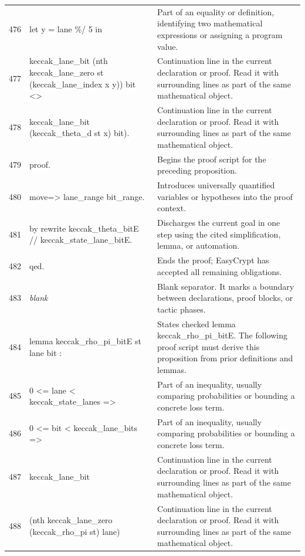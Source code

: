 \documentclass[10pt]{article}
\begin{document}
\begin{longtable}{r L{0.53\textwidth} L{0.37\textwidth}}
476 & {\ttfamily\scriptsize    let y = lane \%/ 5 in} & Part of an equality or definition, identifying two mathematical expressions or assigning a program value. \\
477 & {\ttfamily\scriptsize    keccak\_lane\_bit (nth keccak\_lane\_zero st (keccak\_lane\_index x y)) bit <>} & Continuation line in the current declaration or proof.  Read it with surrounding lines as part of the same mathematical object. \\
478 & {\ttfamily\scriptsize    keccak\_lane\_bit (keccak\_theta\_d st x) bit).} & Continuation line in the current declaration or proof.  Read it with surrounding lines as part of the same mathematical object. \\
479 & {\ttfamily\scriptsize proof.} & Begins the proof script for the preceding proposition. \\
480 & {\ttfamily\scriptsize move=> lane\_range bit\_range.} & Introduces universally quantified variables or hypotheses into the proof context. \\
481 & {\ttfamily\scriptsize by rewrite keccak\_theta\_bitE // keccak\_state\_lane\_bitE.} & Discharges the current goal in one step using the cited simplification, lemma, or automation. \\
482 & {\ttfamily\scriptsize qed.} & Ends the proof; EasyCrypt has accepted all remaining obligations. \\
483 & {\ttfamily\scriptsize \emph{blank}} & Blank separator.  It marks a boundary between declarations, proof blocks, or tactic phases. \\
484 & {\ttfamily\scriptsize lemma keccak\_rho\_pi\_bitE st lane bit :} & States checked lemma keccak\_rho\_pi\_bitE.  The following proof script must derive this proposition from prior definitions and lemmas. \\
485 & {\ttfamily\scriptsize   0 <= lane < keccak\_state\_lanes =>} & Part of an inequality, usually comparing probabilities or bounding a concrete loss term. \\
486 & {\ttfamily\scriptsize   0 <= bit < keccak\_lane\_bits =>} & Part of an inequality, usually comparing probabilities or bounding a concrete loss term. \\
487 & {\ttfamily\scriptsize   keccak\_lane\_bit} & Continuation line in the current declaration or proof.  Read it with surrounding lines as part of the same mathematical object. \\
488 & {\ttfamily\scriptsize     (nth keccak\_lane\_zero (keccak\_rho\_pi st) lane)} & Continuation line in the current declaration or proof.  Read it with surrounding lines as part of the same mathematical object. \\

\end{longtable}
\end{document}
